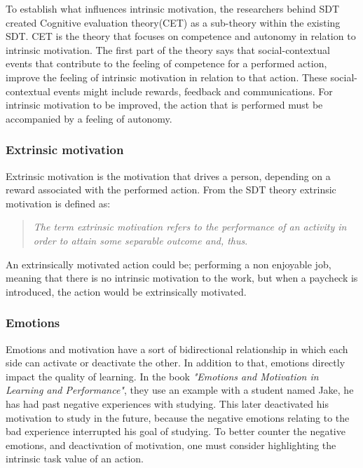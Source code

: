 To establish what influences intrinsic motivation, the researchers behind SDT\cite{SDT} created Cognitive evaluation theory(CET) as a sub-theory within the existing SDT. CET is the theory that focuses on competence and autonomy in relation to intrinsic motivation. The first part of the theory says that social-contextual events that contribute to the feeling of competence for a performed action, improve the feeling of intrinsic motivation in relation to that action\cite[p.~70]{SDT}. These social-contextual events might include rewards, feedback and communications\cite[p.~70]{SDT}. For intrinsic motivation to be improved, the action that is performed must be accompanied by a feeling of autonomy\cite[p.~70]{SDT}.

\subsubsection*{Extrinsic motivation}
Extrinsic motivation is the motivation that drives a person, depending on a reward associated with the performed action. From the SDT theory extrinsic motivation is defined as: 
\begin{quote}
	\textit{The term extrinsic motivation refers to the performance of an activity in order to attain some separable outcome and, thus}\cite[p.~71]{SDT}.\\
\end{quote}
An extrinsically motivated action could be; performing a non enjoyable job, meaning that there is no intrinsic motivation to the work, but when a paycheck is introduced, the action would be extrinsically motivated.

\subsubsection*{Emotions}
Emotions and motivation have a sort of bidirectional relationship in which each side can activate or deactivate the other\cite[p.~66]{emotionsAndMotivation}. In addition to that, emotions directly impact the quality of learning\cite[p.~66]{emotionsAndMotivation}. In the book \textit{"Emotions and Motivation in Learning and Performance"}\cite{emotionsAndMotivation}, they use an example with a student named Jake, he has had past negative experiences with studying. This later deactivated his motivation to study in the future, because the negative emotions relating to the bad experience interrupted his goal of studying\cite[p.~67]{emotionsAndMotivation}. To better counter the negative emotions, and deactivation of motivation, one must consider highlighting the intrinsic task value of an action\cite[p.68]{emotionsAndMotivation}.
